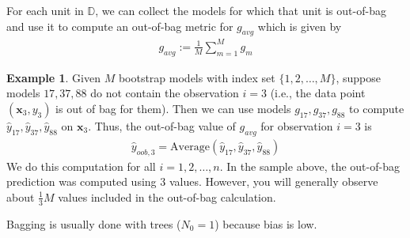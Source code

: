 \documentclass[12pt, a4paper]{article}
\theoremstyle{definition}
\newtheorem*{example}{Example}
\begin{document}
	For each unit in $\mathbb{D}$, we can collect the models for which that unit is
	out-of-bag and use it to compute an out-of-bag metric for $g_{avg}$ which
	is given by
	\begin{align*}
		g_{avg} := \frac{1}{M} \sum_{m=1}^{M}g_m
	\end{align*}
	\begin{tcolorbox}
		\begin{example}
			Given $M$ bootstrap models with index set $\{1,2,\ldots,M\}$,
			suppose models $17, 37,88$ do not contain the observation
			$i=3$ (i.e., the data point $(\bm{x}_3,y_3)$ is out of bag
			for them). Then we can use models $g_{17}, g_{37}, g_{88}$
			to compute $\hat{y}_{17},\hat{y}_{37}, \hat{y}_{88}$ on
			$\bm{x}_3$. Thus, the out-of-bag value of $g_{avg}$ for
			observation $i=3$ is
			\begin{align*}
				\hat{y}_{oob, 3} = \text{Average}(\hat{y}_{17}, \hat{y}_{37}, \hat{y}_{88})
			\end{align*}
			We do this computation for all $i=1,2,\ldots,n$. In the sample
			above, the out-of-bag prediction was computed using 3 values.
			However, you will generally observe about $\frac{1}{3}M$ values
			included in the out-of-bag calculation.
		\end{example}
	\end{tcolorbox}
	Bagging is usually done with trees ($N_0 = 1$) because bias is low.
\end{document}
